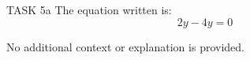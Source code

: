 TASK 5a  
The equation written is:  
\[
2y - 4y = 0
\]  

No additional context or explanation is provided.